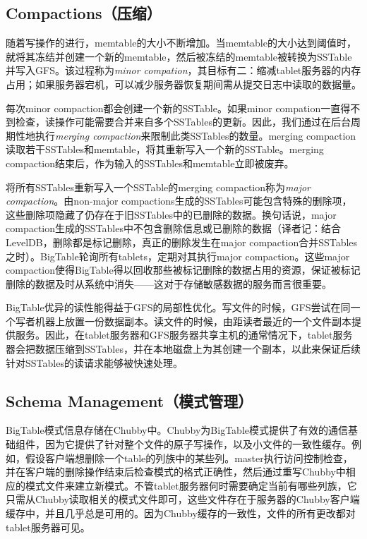 \documentclass{article}
\begin{document}
\subsection{Compactions（压缩）}
随着写操作的进行，memtable的大小不断增加。当memtable的大小达到阈值时，就将其冻结并创建一个新的memtable，然后被冻结的memtable被转换为SSTable并写入GFS。该过程称为\emph{minor compation}，其目标有二：缩减tablet服务器的内存占用；如果服务器宕机，可以减少服务器恢复期间需从提交日志中读取的数据量。\par
每次minor compaction都会创建一个新的SSTable。如果minor compation一直得不到检查，读操作可能需要合并来自多个SSTables的更新。因此，我们通过在后台周期性地执行\emph{merging compaction}来限制此类SSTables的数量。merging compaction读取若干SSTables和memtable，将其重新写入一个新的SSTable。merging compaction结束后，作为输入的SSTables和memtable立即被废弃。\par
将所有SSTables重新写入一个SSTable的merging compaction称为\emph{major compaction}。由non-major compactions生成的SSTables可能包含特殊的删除项，这些删除项隐藏了仍存在于旧SSTables中的已删除的数据。换句话说，major compaction生成的SSTables中不包含删除信息或已删除的数据（译者记：结合LevelDB，删除都是标记删除，真正的删除发生在major compaction合并SSTables之时）。BigTable轮询所有tablets，定期对其执行major compaction。这些major compaction使得BigTable得以回收那些被标记删除的数据占用的资源，保证被标记删除的数据及时从系统中消失——这对于存储敏感数据的服务而言很重要。\par
BigTable优异的读性能得益于GFS的局部性优化。写文件的时候，GFS尝试在同一个写者机器上放置一份数据副本。读文件的时候，由距读者最近的一个文件副本提供服务。因此，在tablet服务器和GFS服务器共享主机的通常情况下，tablet服务器会把数据压缩到SSTables，并在本地磁盘上为其创建一个副本，以此来保证后续针对SSTables的读请求能够被快速处理。

\subsection{Schema Management（模式管理）}
BigTable模式信息存储在Chubby中。Chubby为BigTable模式提供了有效的通信基础组件，因为它提供了针对整个文件的原子写操作，以及小文件的一致性缓存。例如，假设客户端想删除一个table的列族中的某些列。master执行访问控制检查，并在客户端的删除操作结束后检查模式的格式正确性，然后通过重写Chubby中相应的模式文件来建立新模式。不管tablet服务器何时需要确定当前有哪些列族，它只需从Chubby读取相关的模式文件即可，这些文件存在于服务器的Chubby客户端缓存中，并且几乎总是可用的。因为Chubby缓存的一致性，文件的所有更改都对tablet服务器可见。
\end{document}
